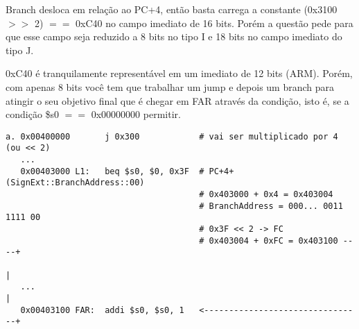 \documentclass{article}
\begin{document}
Branch desloca em relação ao PC+4, então basta carrega a constante (0x3100 $>>$
2) $==$ 0xC40 no campo imediato de 16 bits. Porém a questão pede para que esse
campo seja reduzido a 8 bits no tipo I e 18 bits no campo imediato do tipo J.

0xC40 é tranquilamente representável em um imediato de 12 bits (ARM). Porém, com
apenas 8 bits você tem que trabalhar um jump e depois um branch para atingir o
seu objetivo final que é chegar em FAR através da condição, isto é, se a
condição \$s0 $==$ 0x00000000 permitir.

\begin{verbatim}
a. 0x00400000       j 0x300            # vai ser multiplicado por 4 (ou << 2)
   ...
   0x00403000 L1:   beq $s0, $0, 0x3F  # PC+4+(SignExt::BranchAddress::00)
                                       # 0x403000 + 0x4 = 0x403004
                                       # BranchAddress = 000... 0011 1111 00
                                       # 0x3F << 2 -> FC
                                       # 0x403004 + 0xFC = 0x403100 ----+
                                                                        |
   ...                                                                  |
   0x00403100 FAR:  addi $s0, $s0, 1   <--------------------------------+
\end{verbatim}

\end{document}
